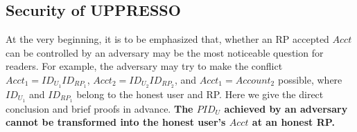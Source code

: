 \begin{comment}
 Below is a brief description about the processes and scripts in UPPRESSO.
\vspace{-\topsep}
\begin{itemize}
\item A browser is an atomic process, which is responsible for sending HTTP requests, receiving HTTP responses, handling user actions, and transmitting messages between scripting processes. As the browsers are considered honest, in the remaining analysis, we focus only on the scripting processes running in the browsers. We refer interested readers to Appendix C and \cite{SPRESSO} for more details about the browser process.
\item The IdP process (defined as $p^i$) only accepts the events whose message is an HTTP request with a path in the set of {\sf \{/script, /dynamicRegistration, /login, /loginInfo, /authorize\}}. %
All the events can be accepted by $p^i$ in any state, but the output may vary. %
\item The RP process (denoted as $p^r$) only accepts the events whose message is an HTTP request with a path in {\sf \{/script, /login, /startNegotiation, /registrationResult, /uploadToken\}}. %
However, an event with a path in {\sf \{ /script, /login, /startNegotiation\}} can be accepted in any state, while an event with a path $\equiv$ {\sf /registrationResult} is accepted only when the state $s$ is the output of an event whose path $\equiv$ {\sf /startNegotiation}. Similarly, the following accepted events should have a path in {\sf \{/registrationResult, /uploadToken\}}.
\item The IdP and RP scripting processes accept the events in the form of HTTP response and postMessage. %
\end{itemize}
\end{comment}

\subsection{Security of UPPRESSO}
At the very beginning, it is to be emphasized that, whether an RP accepted $Acct$ can be controlled by an adversary may be the most noticeable question for readers.
For example, the adversary may try to make the conflict $Acct_1=ID_{U_1}ID_{RP_1}$, $Acct_2=ID_{U_2}ID_{RP_2}$, and $Acct_1=Account_2$ possible, where $ID_{U_1}$ and $ID_{RP_1}$ belong to the honest user and RP.
Here we give the direct conclusion and brief proofs in advance. \textbf{The $PID_U$ achieved by an adversary cannot be transformed into the honest user's $Acct$ at an honest RP.}

